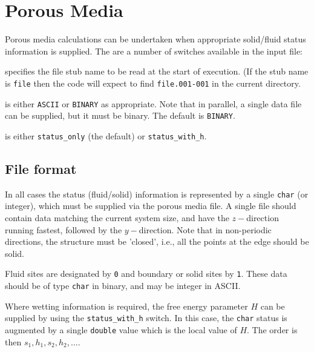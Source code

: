 %
%
%
%
%
%



\section{Porous Media}

Porous media calculations can be undertaken when appropriate
solid/fluid status information is supplied. The are a number
of switches available in the input file:


specifies the file stub name to be read at the start of execution.
(If the stub name is \texttt{file} then the code will expect to
find \texttt{file.001-001} in the current directory.


is either \texttt{ASCII} or \texttt{BINARY} as appropriate. Note that
in parallel, a single data file can be supplied, but it must be binary.
The default is \texttt{BINARY}.


is either \texttt{status\_only} (the default) or \texttt{status\_with\_h}.

\subsection{File format}

In all cases the status (fluid/solid) information is represented by a
single \texttt{char} (or integer), which must be supplied via the
porous media file. A single file should contain data matching the
current system size, and have the $z-$direction running fastest,
followed by the $y-$direction. Note that in non-periodic directions,
the structure must be 'closed', i.e., all the points at the edge
should be solid.

Fluid sites are designated by \texttt{0} and boundary or solid sites
by \texttt{1}. These data should be of type \texttt{char} in binary,
and may be integer in ASCII.

Where wetting information is required, the free energy parameter $H$
can be supplied by using the \texttt{status\_with\_h} switch. In this
case, the \texttt{char} status is augmented by a single \texttt{double}
value which is the local value of $H$. The order is then
$s_1,h_1, s_2, h_2, \ldots$.

